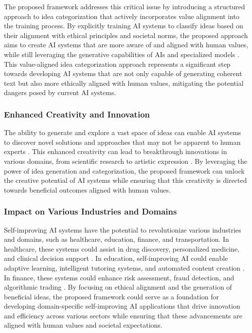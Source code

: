 \documentclass[conference]{article}
\begin{document}
	The proposed framework addresses this critical issue by introducing a structured approach to idea categorization that actively incorporates value alignment into the training process. By explicitly training AI systems to classify ideas based on their alignment with ethical principles and societal norms, the proposed approach aims to create AI systems that are more aware of and aligned with human values, while still leveraging the generative capabilities of AIs and specialized models \cite{bengio2017consciousness}. This value-aligned idea categorization approach represents a significant step towards developing AI systems that are not only capable of generating coherent text but also more ethically aligned with human values, mitigating the potential dangers posed by current AI systems.
	
	\subsubsection{Enhanced Creativity and Innovation}
	The ability to generate and explore a vast space of ideas can enable AI systems to discover novel solutions and approaches that may not be apparent to human experts \cite{boden2004creative}. This enhanced creativity can lead to breakthrough innovations in various domains, from scientific research to artistic expression \cite{ramesh2021zero}. By leveraging the power of idea generation and categorization, the proposed framework can unlock the creative potential of AI systems while ensuring that this creativity is directed towards beneficial outcomes aligned with human values.
	
	\subsubsection{Impact on Various Industries and Domains}
	Self-improving AI systems have the potential to revolutionize various industries and domains, such as healthcare, education, finance, and transportation. In healthcare, these systems could assist in drug discovery, personalized medicine, and clinical decision support \cite{topol2019high}. In education, self-improving AI could enable adaptive learning, intelligent tutoring systems, and automated content creation \cite{woolf2010building}. In finance, these systems could enhance risk assessment, fraud detection, and algorithmic trading \cite{bahrammirzaee2010comparative}. By focusing on ethical alignment and the generation of beneficial ideas, the proposed framework could serve as a foundation for developing domain-specific self-improving AI applications that drive innovation and efficiency across various sectors while ensuring that these advancements are aligned with human values and societal expectations.
\end{document}
